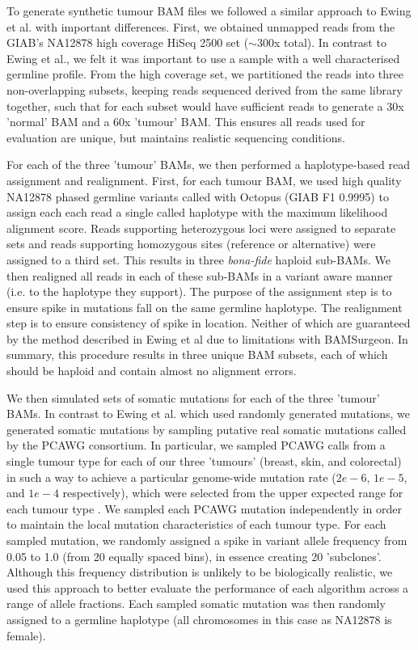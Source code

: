 \documentclass[notitlepage, twocolumn]{article}
\begin{document}
To generate synthetic tumour BAM files we followed a similar approach to Ewing et al. \cite{RN147} with important differences. First, we obtained unmapped reads from the GIAB's NA12878 high coverage HiSeq 2500 set ($\sim 300$x total). In contrast to Ewing et al., we felt it was important to use a sample with a well characterised germline profile. From the high coverage set, we partitioned the reads into three non-overlapping subsets, keeping reads sequenced derived from the same library together, such that for each subset would have sufficient reads to generate a 30x 'normal' BAM and a 60x 'tumour' BAM. This ensures all reads used for evaluation are unique, but maintains realistic sequencing conditions.

For each of the three 'tumour' BAMs, we then performed a haplotype-based read assignment and realignment. First, for each tumour BAM, we used high quality NA12878 phased germline variants called with Octopus (GIAB F1 0.9995) to assign each each read a single called haplotype with the maximum likelihood alignment score. Reads supporting heterozygous loci were assigned to separate sets and reads supporting homozygous sites (reference or alternative) were assigned to a third set. This results in three \emph{bona-fide} haploid sub-BAMs. We then realigned all reads in each of these sub-BAMs in a variant aware manner (i.e. to the haplotype they support). The purpose of the assignment step is to ensure spike in mutations fall on the same germline haplotype. The realignment step is to ensure consistency of spike in location. Neither of which are guaranteed by the method described in Ewing et al due to limitations with BAMSurgeon. In summary, this procedure results in three unique BAM subsets, each of which should be haploid and contain almost no alignment errors.

We then simulated sets of somatic mutations for each of the three 'tumour' BAMs. In contrast to Ewing et al. which used randomly generated mutations, we generated somatic mutations by sampling putative real somatic mutations called by the PCAWG consortium. In particular, we sampled PCAWG calls from a single tumour type for each of our three 'tumours' (breast, skin, and colorectal) in such a way to achieve a particular genome-wide mutation rate ($2e-6$, $1e-5$, and $1e-4$ respectively), which were selected from the upper expected range for each tumour type \cite{RN86}. We sampled each PCAWG mutation independently in order to maintain the local mutation characteristics of each tumour type. For each sampled mutation, we randomly assigned a spike in variant allele frequency from 0.05 to 1.0 (from 20 equally spaced bins), in essence creating 20 'subclones'. Although this frequency distribution is unlikely to be biologically realistic, we used this approach to better evaluate the performance of each algorithm across a range of allele fractions. Each sampled somatic mutation was then randomly assigned to a germline haplotype (all chromosomes in this case as NA12878 is female).
\end{document}
